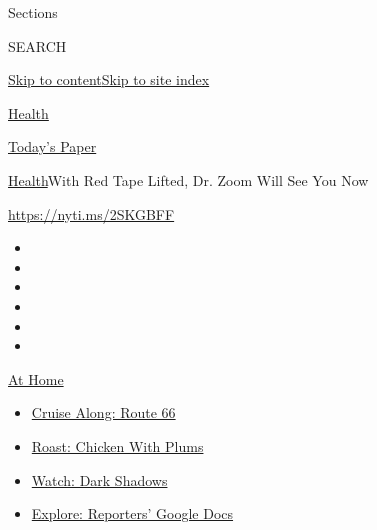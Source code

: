Sections

SEARCH

\protect\hyperlink{site-content}{Skip to
content}\protect\hyperlink{site-index}{Skip to site index}

\href{https://www.nytimes3xbfgragh.onion/section/health}{Health}

\href{https://myaccount.nytimes3xbfgragh.onion/auth/login?response_type=cookie\&client_id=vi}{}

\href{https://www.nytimes3xbfgragh.onion/section/todayspaper}{Today's
Paper}

\href{/section/health}{Health}\textbar{}With Red Tape Lifted, Dr. Zoom
Will See You Now

\url{https://nyti.ms/2SKGBFF}

\begin{itemize}
\item
\item
\item
\item
\item
\item
\end{itemize}

\href{https://www.nytimes3xbfgragh.onion/spotlight/at-home?action=click\&pgtype=Article\&state=default\&region=TOP_BANNER\&context=at_home_menu}{At
Home}

\begin{itemize}
\tightlist
\item
  \href{https://www.nytimes3xbfgragh.onion/2020/09/07/travel/route-66.html?action=click\&pgtype=Article\&state=default\&region=TOP_BANNER\&context=at_home_menu}{Cruise
  Along: Route 66}
\item
  \href{https://www.nytimes3xbfgragh.onion/2020/09/04/dining/sheet-pan-chicken.html?action=click\&pgtype=Article\&state=default\&region=TOP_BANNER\&context=at_home_menu}{Roast:
  Chicken With Plums}
\item
  \href{https://www.nytimes3xbfgragh.onion/2020/09/04/arts/television/dark-shadows-stream.html?action=click\&pgtype=Article\&state=default\&region=TOP_BANNER\&context=at_home_menu}{Watch:
  Dark Shadows}
\item
  \href{https://www.nytimes3xbfgragh.onion/interactive/2020/at-home/even-more-reporters-editors-diaries-lists-recommendations.html?action=click\&pgtype=Article\&state=default\&region=TOP_BANNER\&context=at_home_menu}{Explore:
  Reporters' Google Docs}
\end{itemize}

